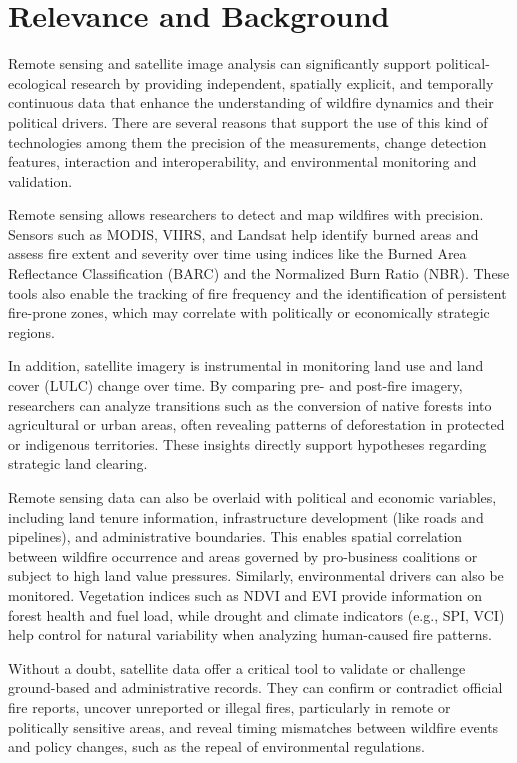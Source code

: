 \section{Relevance and Background}

Remote sensing and satellite image analysis can significantly support political-ecological research by providing independent, spatially explicit, and temporally continuous data that enhance the understanding of wildfire dynamics and their political drivers. There are several reasons that support the use of this kind of technologies among them the precision of the measurements, change detection features, interaction and interoperability, and environmental monitoring and validation.

Remote sensing allows researchers to detect and map wildfires with precision. Sensors such as MODIS, VIIRS, and Landsat help identify burned areas and assess fire extent and severity over time using indices like the Burned Area Reflectance Classification (BARC) and the Normalized Burn Ratio (NBR). These tools also enable the tracking of fire frequency and the identification of persistent fire-prone zones, which may correlate with politically or economically strategic regions.

In addition, satellite imagery is instrumental in monitoring land use and land cover (LULC) change over time. By comparing pre- and post-fire imagery, researchers can analyze transitions such as the conversion of native forests into agricultural or urban areas, often revealing patterns of deforestation in protected or indigenous territories. These insights directly support hypotheses regarding strategic land clearing.

Remote sensing data can also be overlaid with political and economic variables, including land tenure information, infrastructure development (like roads and pipelines), and administrative boundaries. This enables spatial correlation between wildfire occurrence and areas governed by pro-business coalitions or subject to high land value pressures. Similarly, environmental drivers can also be monitored. Vegetation indices such as NDVI and EVI provide information on forest health and fuel load, while drought and climate indicators (e.g., SPI, VCI) help control for natural variability when analyzing human-caused fire patterns.

Without a doubt, satellite data offer a critical tool to validate or challenge ground-based and administrative records. They can confirm or contradict official fire reports, uncover unreported or illegal fires, particularly in remote or politically sensitive areas, and reveal timing mismatches between wildfire events and policy changes, such as the repeal of environmental regulations.

